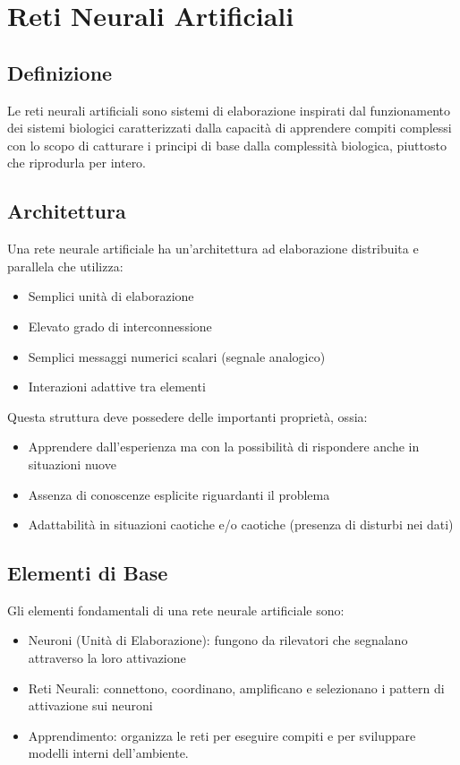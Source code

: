 \newpage
\section{Reti Neurali Artificiali}

\subsection{Definizione}
Le reti neurali artificiali sono sistemi di elaborazione inspirati dal funzionamento dei sistemi biologici caratterizzati dalla capacità di apprendere compiti complessi con lo scopo di catturare i principi di base dalla complessità biologica, piuttosto che riprodurla per intero.

\subsection{Architettura}
Una rete neurale artificiale ha un'architettura ad elaborazione distribuita e parallela che utilizza:
\begin{itemize}
    \item Semplici unità di elaborazione
    \item Elevato grado di interconnessione
    \item Semplici messaggi numerici scalari (segnale analogico)
    \item Interazioni adattive tra elementi
\end{itemize}

Questa struttura deve possedere delle importanti proprietà, ossia:
\begin{itemize}
    \item Apprendere dall'esperienza ma con la possibilità di rispondere anche in situazioni nuove
    \item Assenza di conoscenze esplicite riguardanti il problema
    \item Adattabilità in situazioni caotiche e/o caotiche (presenza di disturbi nei dati)
\end{itemize}

\subsection{Elementi di Base}
Gli elementi fondamentali di una rete neurale artificiale sono:
\begin{itemize}
    \item Neuroni (Unità di Elaborazione): fungono da rilevatori che segnalano attraverso la loro attivazione
    \item Reti Neurali: connettono, coordinano, amplificano e selezionano i pattern di attivazione sui neuroni
    \item Apprendimento: organizza le reti per eseguire compiti e per sviluppare modelli interni dell'ambiente.
\end{itemize}

